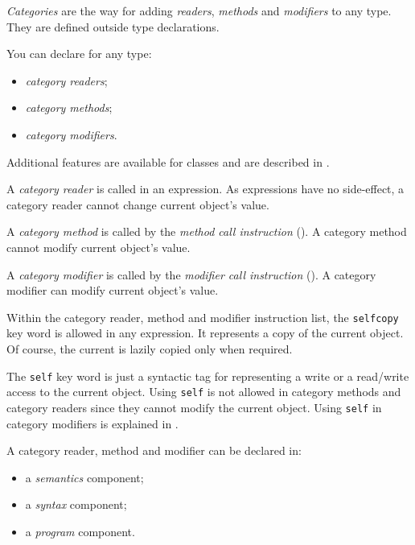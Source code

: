

\emph{Categories} are the way for adding \emph{readers}, \emph{methods} and \emph{modifiers} to any type. They are defined outside type declarations.

You can declare for any type:
\begin{itemize}
\item \emph{category readers};
\item \emph{category methods};
\item \emph{category modifiers}.
\end{itemize}

Additional features are available for classes and are described in .


A \emph{category reader} is called in an expression. As expressions have no side-effect, a category reader cannot change current object's value.

A \emph{category method} is called by the \emph{method call instruction} (). A category method cannot modify current object's value.

A \emph{category modifier} is called by the \emph{modifier call instruction} (). A category modifier can modify current object's value.

Within the category reader, method and modifier instruction list, the \lstinline[language=galgas]!selfcopy! key word is allowed in any expression. It represents a copy of the current object. Of course, the current is lazily copied only when required.

The \lstinline[language=galgas]!self! key word is just a syntactic tag for representing a write or a read/write access to the current object. Using \lstinline[language=galgas]!self! is not allowed in category methods and category readers since they cannot modify the current object. Using \lstinline[language=galgas]!self! in category modifiers is explained in . 


A category reader, method and modifier can be declared in:
\begin{itemize}
\item a \emph{semantics} component;
\item a \emph{syntax} component;
\item a \emph{program} component.
\end{itemize}

